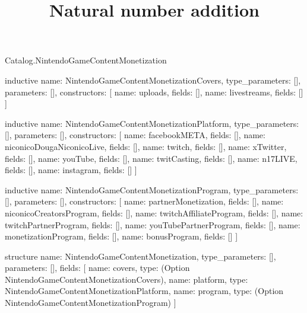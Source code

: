 \begin{lexlean}{Catalog.NintendoGameContentMonetization}
\title{Natural number addition}
\begin{semanticmodule}
inductive{
  name: NintendoGameContentMonetizationCovers,
  type_parameters: [],
  parameters: [],
  constructors: [
    {name: uploads, fields: []},
    {name: livestreams, fields: []}
  ]
}

inductive{
  name: NintendoGameContentMonetizationPlatform,
  type_parameters: [],
  parameters: [],
  constructors: [
    {name: facebookMETA, fields: []},
    {name: niconicoDougaNiconicoLive, fields: []},
    {name: twitch, fields: []},
    {name: xTwitter, fields: []},
    {name: youTube, fields: []},
    {name: twitCasting, fields: []},
    {name: n17LIVE, fields: []},
    {name: instagram, fields: []}
  ]
}

inductive{
  name: NintendoGameContentMonetizationProgram,
  type_parameters: [],
  parameters: [],
  constructors: [
    {name: partnerMonetization, fields: []},
    {name: niconicoCreatorsProgram, fields: []},
    {name: twitchAffiliateProgram, fields: []},
    {name: twitchPartnerProgram, fields: []},
    {name: youTubePartnerProgram, fields: []},
    {name: monetizationProgram, fields: []},
    {name: bonusProgram, fields: []}
  ]
}

structure{
  name: NintendoGameContentMonetization,
  type_parameters: [],
  parameters: [],
  fields: [
    {name: covers, type: (Option NintendoGameContentMonetizationCovers)},
    {name: platform, type: NintendoGameContentMonetizationPlatform},
    {name: program, type: (Option NintendoGameContentMonetizationProgram)}
  ]
}
\end{semanticmodule}
\end{lexlean}

